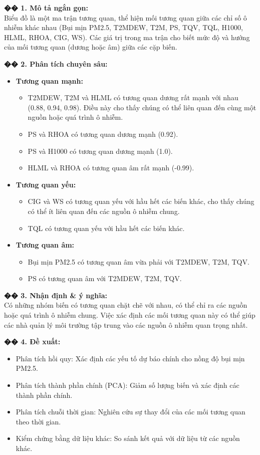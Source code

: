 \documentclass[12pt,a4paper]{article}
\begin{document}
\begin{aibox}
\textbf{�� 1. Mô tả ngắn gọn:}\\
Biểu đồ là một ma trận tương quan, thể hiện mối tương quan giữa các chỉ số ô nhiễm khác nhau (Bụi mịn PM2.5, T2MDEW, T2M, PS, TQV, TQL, H1000, HLML, RHOA, CIG, WS). Các giá trị trong ma trận cho biết mức độ và hướng của mối tương quan (dương hoặc âm) giữa các cặp biến.

\textbf{�� 2. Phân tích chuyên sâu:}
\begin{itemize}
    \item \textbf{Tương quan mạnh:}
    \begin{itemize}
        \item T2MDEW, T2M và HLML có tương quan dương rất mạnh với nhau (0.88, 0.94, 0.98). Điều này cho thấy chúng có thể liên quan đến cùng một nguồn hoặc quá trình ô nhiễm.
        \item PS và RHOA có tương quan dương mạnh (0.92).
        \item PS và H1000 có tương quan dương mạnh (1.0).
        \item HLML và RHOA có tương quan âm rất mạnh (-0.99).
    \end{itemize}
    \item \textbf{Tương quan yếu:}
    \begin{itemize}
        \item CIG và WS có tương quan yếu với hầu hết các biến khác, cho thấy chúng có thể ít liên quan đến các nguồn ô nhiễm chung.
        \item TQL có tương quan yếu với hầu hết các biến khác.
    \end{itemize}
    \item \textbf{Tương quan âm:}
    \begin{itemize}
        \item Bụi mịn PM2.5 có tương quan âm vừa phải với T2MDEW, T2M, TQV.
        \item PS có tương quan âm với T2MDEW, T2M, TQV.
    \end{itemize}
\end{itemize}

\textbf{�� 3. Nhận định \& ý nghĩa:}\\
Có những nhóm biến có tương quan chặt chẽ với nhau, có thể chỉ ra các nguồn hoặc quá trình ô nhiễm chung. Việc xác định các mối tương quan này có thể giúp các nhà quản lý môi trường tập trung vào các nguồn ô nhiễm quan trọng nhất.

\textbf{�� 4. Đề xuất:}
\begin{itemize}
    \item Phân tích hồi quy: Xác định các yếu tố dự báo chính cho nồng độ bụi mịn PM2.5.
    \item Phân tích thành phần chính (PCA): Giảm số lượng biến và xác định các thành phần chính.
    \item Phân tích chuỗi thời gian: Nghiên cứu sự thay đổi của các mối tương quan theo thời gian.
    \item Kiểm chứng bằng dữ liệu khác: So sánh kết quả với dữ liệu từ các nguồn khác.
\end{itemize}
\end{aibox}
\end{document}
